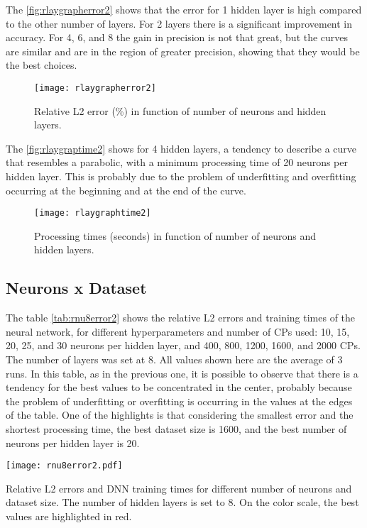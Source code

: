 \documentclass[conference]{IEEEtran}
\begin{document}
The \autoref{fig:rlaygrapherror2} shows that the error for 1 hidden layer is high compared to the other number of layers. For 2 layers there is a significant improvement in accuracy. For 4, 6, and 8 the gain in precision is not that great, but the curves are similar and are in the region of greater precision, showing that they would be the best choices.

\begin{figure}[htb]
	\centering
	\texttt{[image: rlaygrapherror2]}
	\caption{Relative L2 error (\%) in function of number of neurons and hidden layers.}
	\label{fig:rlaygrapherror2}
\end{figure}

The \autoref{fig:rlaygraptime2} shows for 4 hidden layers, a tendency to describe a curve that resembles a parabolic, with a minimum processing time of 20 neurons per hidden layer. This is probably due to the problem of underfitting and overfitting occurring at the beginning and at the end of the curve.

\begin{figure}[htb]
	\centering
	\texttt{[image: rlaygraphtime2]}
	\caption{Processing times (seconds) in function of number of neurons and hidden layers.}
	\label{fig:rlaygraptime2}
\end{figure}

\subsection{Neurons x Dataset}

The table \autoref{tab:rnu8error2} shows the relative L2 errors and training times of the neural network, for different hyperparameters and number of CPs used: 10, 15, 20, 25, and 30 neurons per hidden layer, and 400, 800, 1200, 1600, and 2000 CPs.
The number of layers was set at 8.
All values shown here are the average of 3 runs.
In this table, as in the previous one, it is possible to observe that there is a tendency for the best values to be concentrated in the center, probably because the problem of underfitting or overfitting is occurring in the values at the edges of the table. One of the highlights is that considering the smallest error and the shortest processing time, the best dataset size is 1600, and the best number of neurons per hidden layer is 20.

\begin{table}[htb]
	\centering
	\texttt{[image: rnu8error2.pdf]}
	\caption{Relative L2 errors and DNN training times for different number of neurons and dataset size. The number of hidden layers is set to 8. On the color scale, the best values are highlighted in red.}
	\label{tab:rnu8error2}
\end{table}
\end{document}
